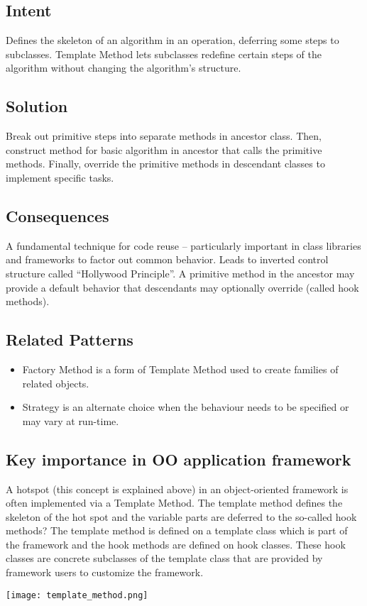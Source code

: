 \subsection{Intent}
Defines the skeleton of an algorithm in an operation, deferring some steps to subclasses. Template Method lets subclasses redefine certain steps of the algorithm without changing the algorithm's structure.
\subsection{Solution}
Break out primitive steps into separate methods in ancestor class. Then, construct method for basic algorithm in ancestor that calls the primitive methods. Finally, override the primitive methods in descendant classes to implement specific tasks.
\subsection{Consequences}
A fundamental technique for code reuse – particularly important in class libraries and frameworks to factor out common behavior.
Leads to inverted control structure called “Hollywood Principle”.
A primitive method in the ancestor may provide a default behavior that descendants may optionally override (called hook methods).
\subsection{Related Patterns}
\begin{itemize}
\item  Factory Method is a form of Template Method used to create families of related objects.
\item Strategy is an alternate choice when the behaviour needs to be specified or may vary at run-time.
\end{itemize}
\subsection{Key importance in OO application framework}
A hotspot (this concept is explained above) in an object-oriented framework is often implemented via a Template Method. The template method defines the skeleton of the hot spot and the variable parts are deferred to the so-called hook methods?
The template method is defined on a template class which is part of the framework and the hook methods are defined on hook classes. These hook classes are concrete subclasses of the template class that are provided by framework users to customize the framework.

\begin{center}
\texttt{[image: template\_method.png]}
\end{center}